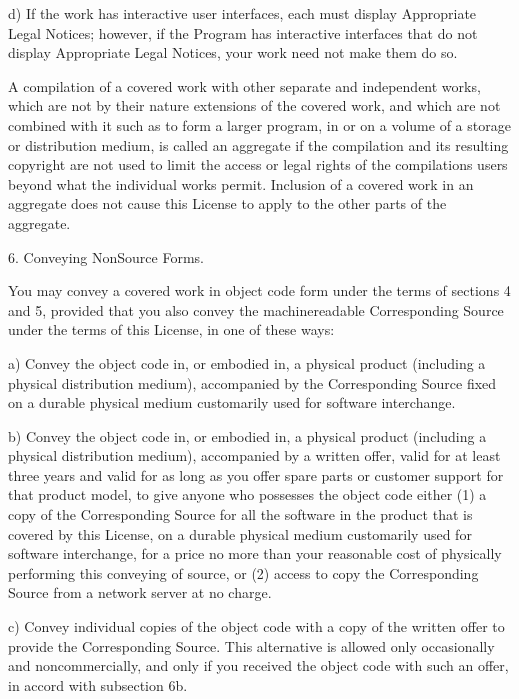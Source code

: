 \documentclass[letterpaper,10pt,english]{sphinxmanual}
\begin{document}
\begin{sphinxVerbatim}[commandchars=\\\{\}]
    d) If the work has interactive user interfaces, each must display
    Appropriate Legal Notices; however, if the Program has interactive
    interfaces that do not display Appropriate Legal Notices, your
    work need not make them do so.

  A compilation of a covered work with other separate and independent
works, which are not by their nature extensions of the covered work,
and which are not combined with it such as to form a larger program,
in or on a volume of a storage or distribution medium, is called an
\PYGZdq{}aggregate\PYGZdq{} if the compilation and its resulting copyright are not
used to limit the access or legal rights of the compilation\PYGZsq{}s users
beyond what the individual works permit.  Inclusion of a covered work
in an aggregate does not cause this License to apply to the other
parts of the aggregate.

  6. Conveying Non\PYGZhy{}Source Forms.

  You may convey a covered work in object code form under the terms
of sections 4 and 5, provided that you also convey the
machine\PYGZhy{}readable Corresponding Source under the terms of this License,
in one of these ways:

    a) Convey the object code in, or embodied in, a physical product
    (including a physical distribution medium), accompanied by the
    Corresponding Source fixed on a durable physical medium
    customarily used for software interchange.

    b) Convey the object code in, or embodied in, a physical product
    (including a physical distribution medium), accompanied by a
    written offer, valid for at least three years and valid for as
    long as you offer spare parts or customer support for that product
    model, to give anyone who possesses the object code either (1) a
    copy of the Corresponding Source for all the software in the
    product that is covered by this License, on a durable physical
    medium customarily used for software interchange, for a price no
    more than your reasonable cost of physically performing this
    conveying of source, or (2) access to copy the
    Corresponding Source from a network server at no charge.

    c) Convey individual copies of the object code with a copy of the
    written offer to provide the Corresponding Source.  This
    alternative is allowed only occasionally and noncommercially, and
    only if you received the object code with such an offer, in accord
    with subsection 6b.


\end{sphinxVerbatim}
\end{document}
